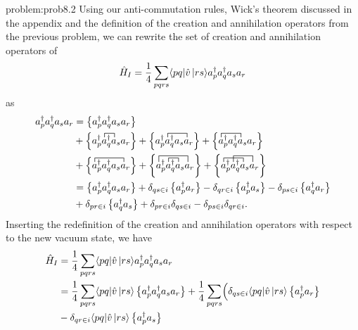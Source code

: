 \begin{sol}{problem:prob8.2}
Using our anti-commutation rules, Wick's theorem discussed in the appendix and the definition of the creation and annihilation operators from the previous problem, we can rewrite the set of creation and annihilation operators of 
    \begin{equation*}
        \hat{H}_I = \frac{1}{4} \sum_{pqrs} \langle pq|\hat{v}\,|{rs}\rangle a^\dagger_p a^\dagger_q a_s  a_r
    \end{equation*}
as
\begin{align*}
    a^\dagger_p a^\dagger_q a_s  a_r &=\normord{a^\dagger_p a^\dagger_q a_s  a_r} \\
        & + \normord{
            \contraction{a^\dagger_p}{a}{{}^\dagger_q}{a}a^\dagger_p a^\dagger_q a_s  a_r}+ \normord{\contraction{a^\dagger_p}{a}{{}^\dagger_q a_s}{a}
            a^\dagger_p a^\dagger_q a_s  a_r}+ \normord{\contraction{}{a}{{}^\dagger_p a^\dagger_q}{a}a^\dagger_p a^\dagger_q a_s  a_r}  \\
        & + \normord{\contraction{}{a}{{}^\dagger_p a^\dagger_q a_s}{a}a^\dagger_p a^\dagger_q a_s  a_r}+ \normord{\contraction[1.5ex]{}{a}{{}^\dagger_p a_q^\dagger a_s}{a}
            \contraction{a^\dagger_p}{a}{{}^\dagger_q}{a}a^\dagger_p a^\dagger_q a_s  a_r}+ \normord{\contraction{}{a}{{}^\dagger_p a_q^\dagger}{a}\contraction[1.5ex]{a^\dagger_p}{a}{{}^\dagger_q a_s}{a}a^\dagger_p a^\dagger_q a_s  a_r} \\
    &= \normord{a^\dagger_p a^\dagger_q a_s  a_r}+ \delta_{qs\in i} \normord{ a^\dagger_p a_r}- \delta_{qr \in i} \normord{a^\dagger_p a_s}
        - \delta_{ps \in i} \normord{a^\dagger_q a_r}\\
        & + \delta_{pr \in i} \normord{a^\dagger_q a_s} 
        + \delta_{pr \in i} \delta_{qs \in i} - \delta_{ps \in i} \delta_{qr \in i}.
\end{align*}
 Inserting the redefinition of the creation and annihilation operators with respect to the new vacuum state, we have   
    \begin{align*}
    \hat{H}_I &= \frac{1}{4} \sum_{pqrs} \element{pq}{\hat{v}}{rs} a^\dagger_p a^\dagger_q a_s  a_r \\
        &= \frac{1}{4} \sum_{pqrs} \element{pq}{\hat{v}}{rs} \normord{a^\dagger_p a^\dagger_q a_s  a_r} 
        + \frac{1}{4} \sum_{pqrs} \Bigl( 
            \delta_{qs\in i} \element{pq}{\hat{v}}{rs} \normord{ a^\dagger_p a_r}\\
        & - \delta_{qr \in i} \element{pq}{\hat{v}}{rs} \normord{a^\dagger_p a_s}

\end{align*}
\end{sol}
